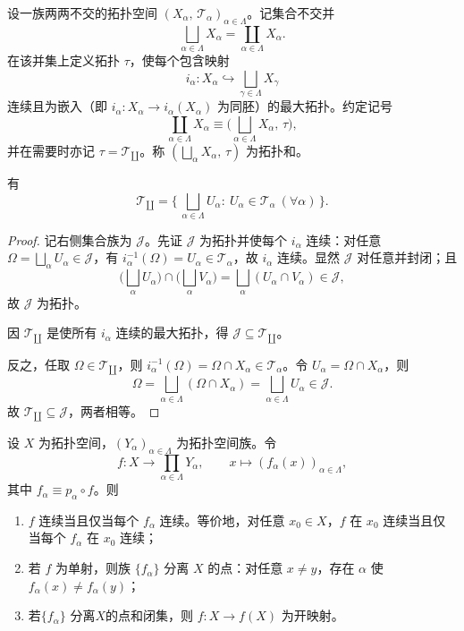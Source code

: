 \documentclass[lang=cn,a4paper,newtx,figureplace=section,tableplace=section]{elegantbook}
\begin{document}
 \begin{definition}\label{def:topological-sum}
  设一族两两不交的拓扑空间 $(X_\alpha,\,\mathcal T_\alpha)_{\alpha\in\Lambda}$。记集合不交并
  \[
   \bigsqcup_{\alpha\in\Lambda} X_\alpha=\coprod_{\alpha\in\Lambda} X_\alpha.
  \]
  在该并集上定义拓扑 $\tau$，使每个包含映射
  \[
   i_\alpha:X_\alpha\hookrightarrow \bigsqcup_{\gamma\in\Lambda} X_\gamma
  \]
  连续且为嵌入（即 $i_\alpha:X_\alpha\to i_\alpha(X_\alpha)$ 为同胚）的最大拓扑。约定记号
  \[
   \coprod_{\alpha\in\Lambda} X_\alpha\equiv\big(\bigsqcup_{\alpha\in\Lambda} X_\alpha,\,\tau\big),
  \]
  并在需要时亦记 $\tau=\mathcal T_{\coprod}$。称 $(\bigsqcup_{\alpha}X_\alpha,\,\tau)$ 为拓扑和。
 \end{definition}
  
  \begin{proposition}[拓扑和的显式刻画]\label{prop:sum-topology-explicit}
  有
  \[
   \mathcal T_{\coprod}
   =\Big\{\,\bigsqcup_{\alpha\in\Lambda} U_\alpha:\ U_\alpha\in\mathcal T_\alpha\ (\forall\alpha)\,\Big\}.
  \]
 \end{proposition}
 \begin{proof}
  记右侧集合族为 $\mathcal J$。先证 $\mathcal J$ 为拓扑并使每个 $i_\alpha$ 连续：对任意 $\Omega=\bigsqcup_\alpha U_\alpha\in\mathcal J$，有 $i_\alpha^{-1}(\Omega)=U_\alpha\in\mathcal T_\alpha$，故 $i_\alpha$ 连续。显然 $\mathcal J$ 对任意并封闭；且
  \[
   \Big(\bigsqcup_\alpha U_\alpha\Big)\cap\Big(\bigsqcup_\alpha V_\alpha\Big)=\bigsqcup_\alpha (U_\alpha\cap V_\alpha)\in\mathcal J,
  \]
  故 $\mathcal J$ 为拓扑。
  
  因 $\mathcal T_{\coprod}$ 是使所有 $i_\alpha$ 连续的最大拓扑，得 $\mathcal J\subseteq\mathcal T_{\coprod}$。
  
  反之，任取 $\Omega\in\mathcal T_{\coprod}$，则 $i_\alpha^{-1}(\Omega)=\Omega\cap X_\alpha\in\mathcal T_\alpha$。令 $U_\alpha=\Omega\cap X_\alpha$，则
  \[
   \Omega=\bigsqcup_{\alpha\in\Lambda}(\Omega\cap X_\alpha)=\bigsqcup_{\alpha\in\Lambda} U_\alpha\in\mathcal J.
  \]
  故 $\mathcal T_{\coprod}\subseteq\mathcal J$，两者相等。
 \end{proof}

 \begin{lemma}[嵌入引理]\label{lem:product-coordinates}
  设 $X$ 为拓扑空间，$(Y_\alpha)_{\alpha\in\Lambda}$ 为拓扑空间族。令
  \[
   f:X\to \prod_{\alpha\in\Lambda} Y_\alpha,\qquad x\mapsto (f_\alpha(x))_{\alpha\in\Lambda},
  \]
  其中 $f_\alpha\equiv p_\alpha\circ f$。则
  \begin{enumerate}
    \item $f$ 连续当且仅当每个 $f_\alpha$ 连续。等价地，对任意 $x_0\in X$，$f$ 在 $x_0$ 连续当且仅当每个 $f_\alpha$ 在 $x_0$ 连续；
    \item 若 $f$ 为单射，则族 $\{f_\alpha\}$ 分离 $X$ 的点：对任意 $x\neq y$，存在 $\alpha$ 使 $f_\alpha(x)\neq f_\alpha(y)$；
    \item 若$\{f_\alpha\}$ 分离$X$的点和闭集，则 $f:X\to f(X)$ 为开映射。
  \end{enumerate}
 \end{lemma}
 
\end{document}
